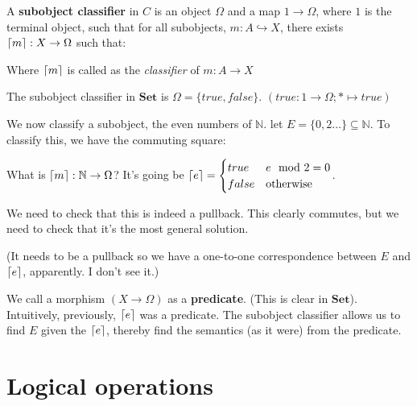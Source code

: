 \documentclass[11pt]{book}
\DeclarePairedDelimiter{\ceil}{\lceil}{\rceil}
\newcommand{\N}{\ensuremath{\mathbb{N}}}
\newcommand{\inj}{\hookrightarrow}
\newcommand{\mono}{\inj}
\newcommand{\Set}{\ensuremath{\mathbf{Set}} }
\begin{document}
\begin{itemize}
        A \textbf{subobject classifier} in $C$ is an object $\Omega$ and a map $1 \rightarrow \Omega$, where $1$ is the terminal object,
        such that for all subobjects, $m: A \mono X$, there exists $\ceil m: X \to \Omega$ such that:


        Where $\ceil m$ is called as the \emph{classifier} of $m: A \rightarrow X$
\end{itemize}

The subobject classifier in $\Set$ is $\Omega = \{ true, false \}$. $(true: 1 \rightarrow \Omega; * \mapsto true)$

We now classify a subobject, the even numbers of \N. let $E = \{ 0, 2 \dots \} \subseteq \N$.
To classify this, we have the commuting square:


What is $\ceil m: \N \rightarrow \Omega$? It's going be 
$\ceil e = \begin{cases} true & e \mod 2 = 0 \\ false & \text{otherwise} \end{cases}$.

We need to check that this is indeed a pullback. This clearly commutes, but
we need to check that it's the most general solution.

(It needs to be a pullback so we have a one-to-one correspondence between $E$ and $\ceil e$, apparently.
I don't see it.)

We call a morphism $(X \rightarrow \Omega)$ as a \textbf{predicate}. (This is clear in $\Set$).
Intuitively, previously, $\ceil e$ was a predicate.  The subobject classifier
allows us to find $E$ given the $\ceil e$, thereby find the semantics (as it
were) from the predicate.

\section{Logical operations}
\end{document}
